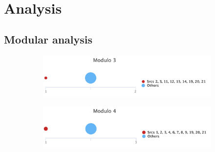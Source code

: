 \chapter{Analysis}

\label{appendix-analysis}

\section{Modular analysis}
\label{appendix-modular-analysis}

\begin{figure}[ht]
\centering
\begin{adjustbox}{minipage=\linewidth,scale=0.8}
\begin{subfigure}{0.45\textwidth}
	\includegraphics[width=\linewidth]{tex/images/analysis/mod3}
\end{subfigure}
\hfill
\begin{subfigure}{0.45\textwidth}
	\includegraphics[width=\linewidth]{tex/images/analysis/mod4}
\end{subfigure}\\


\end{adjustbox}
\end{figure}
